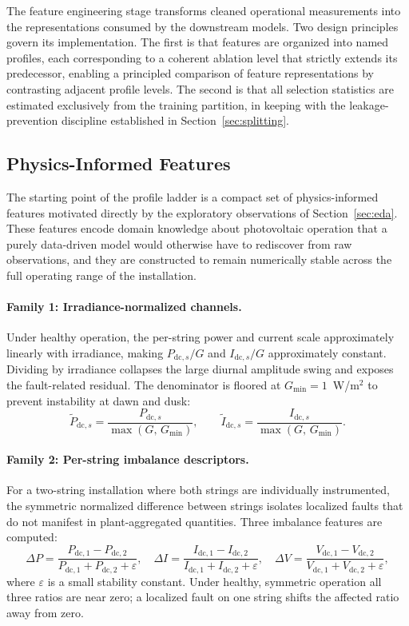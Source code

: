 The feature engineering stage transforms cleaned operational measurements into the representations consumed by the downstream models. Two design principles govern its implementation. The first is that features are organized into named profiles, each corresponding to a coherent ablation level that strictly extends its predecessor, enabling a principled comparison of feature representations by contrasting adjacent profile levels. The second is that all selection statistics are estimated exclusively from the training partition, in keeping with the leakage-prevention discipline established in Section~\ref{sec:splitting}.

\subsection{Physics-Informed Features}

The starting point of the profile ladder is a compact set of physics-informed features motivated directly by the exploratory observations of Section~\ref{sec:eda}. These features encode domain knowledge about photovoltaic operation that a purely data-driven model would otherwise have to rediscover from raw observations, and they are constructed to remain numerically stable across the full operating range of the installation.

\paragraph{Family 1: Irradiance-normalized channels.}
Under healthy operation, the per-string power and current scale approximately linearly with irradiance, making $P_{\mathrm{dc},s}/G$ and $I_{\mathrm{dc},s}/G$ approximately constant. Dividing by irradiance collapses the large diurnal amplitude swing and exposes the fault-related residual. The denominator is floored at $G_{\min} = 1$~W/m$^2$ to prevent instability at dawn and dusk:
\[
    \tilde{P}_{\mathrm{dc},s} = \frac{P_{\mathrm{dc},s}}{\max(G,\, G_{\min})}, \qquad
    \tilde{I}_{\mathrm{dc},s} = \frac{I_{\mathrm{dc},s}}{\max(G,\, G_{\min})}.
\]

\paragraph{Family 2: Per-string imbalance descriptors.}
For a two-string installation where both strings are individually instrumented, the symmetric normalized difference between strings isolates localized faults that do not manifest in plant-aggregated quantities. Three imbalance features are computed:
\[
    \Delta P = \frac{P_{\mathrm{dc},1} - P_{\mathrm{dc},2}}{P_{\mathrm{dc},1} + P_{\mathrm{dc},2} + \varepsilon}, \quad
    \Delta I = \frac{I_{\mathrm{dc},1} - I_{\mathrm{dc},2}}{I_{\mathrm{dc},1} + I_{\mathrm{dc},2} + \varepsilon}, \quad
    \Delta V = \frac{V_{\mathrm{dc},1} - V_{\mathrm{dc},2}}{V_{\mathrm{dc},1} + V_{\mathrm{dc},2} + \varepsilon},
\]
where $\varepsilon$ is a small stability constant. Under healthy, symmetric operation all three ratios are near zero; a localized fault on one string shifts the affected ratio away from zero.

